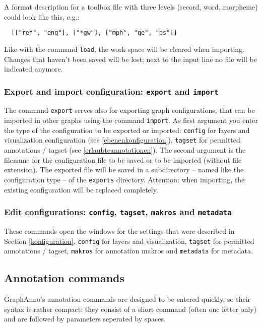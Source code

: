 \documentclass[12pt]{scrartcl}
\begin{document}
A format description for a toolbox file with three levels (record, word, morpheme) could look like this, e.g.:

\begin{verbatim}
  [["ref", "eng"], ["*gw"], ["mph", "ge", "ps"]]
\end{verbatim}

Like with the command \texttt{load}, the work space will be cleared when importing.
Changes that haven’t been saved will be lost; next to the input line no file will be indicated anymore.


\subsubsection{Export and import configuration: \texttt{export} and \texttt{import}}

The command \texttt{export} serves also for exporting graph configurations, that can be imported in other graphs using the command \texttt{import}.
As first argument you enter the type of the configuration to be exported or imported: \texttt{config} for layers and visualization configuration (see \ref{ebenenkonfiguration}), \texttt{tagset} for permitted annotations / tagset (see \ref{erlaubteannotationen}).
The second argument is the filename for the configuration file to be saved or to be imported (without file extension).
The exported file will be saved in a subdirectory – named like the configuration type – of the \texttt{exports} directory.
Attention: when importing, the existing configuration will be replaced completely.


\subsubsection{Edit configurations: \texttt{config}, \texttt{tagset}, \texttt{makros} and \texttt{metadata}}

These commands open the windows for the settings that were described in Section \ref{konfiguration}.
\texttt{config} for layers and visualization, \texttt{tagset} for permitted annotations / tagset, \texttt{makros} for annotation makros and \texttt{metadata} for metadata.



\subsection{Annotation commands}\label{annotationsbefehle}

GraphAnno’s annotation commands are designed to be entered quickly, so their syntax is rather compact:
they consist of a short command (often one letter only) and are followed by parameters seperated by spaces.
\end{document}
